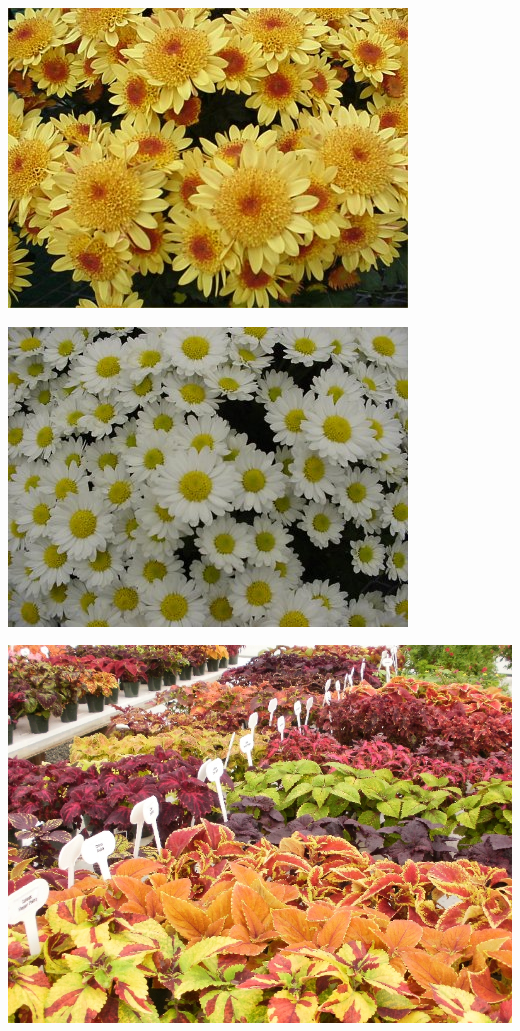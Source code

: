 \documentclass{article}
\begin{document}
\begin{center}
\includegraphics[width=0.9\textheight, angle=90]{../Chrysanthemum_SunFire.jpg}
\end{center}
\newpage

\begin{center}
\includegraphics[width=0.9\textheight, angle=90]{../Chrysanthemum_Sylvie.jpg}
\end{center}
\newpage

\begin{center}
\includegraphics[width=0.9\textheight, angle=90]{../Coleus1.jpg}
\end{center}
\newpage
\end{document}

